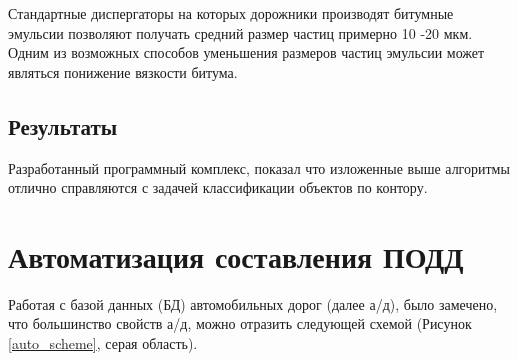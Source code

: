 Стандартные диспергаторы на которых дорожники производят битумные эмульсии позволяют получать средний размер частиц примерно 10 -20 мкм. Одним из возможных способов уменьшения размеров частиц эмульсии может являться понижение вязкости битума.
%
%

\subsection{Результаты}
Разработанный программный комплекс, показал что изложенные выше алгоритмы отлично справляются с задачей классификации объектов по контору.

\section{Автоматизация составления ПОДД}
Работая с базой данных (БД) автомобильных дорог (далее а/д), было замечено, что большинство свойств а/д, можно отразить следующей схемой (Рисунок \ref{auto_scheme}, серая область). 

